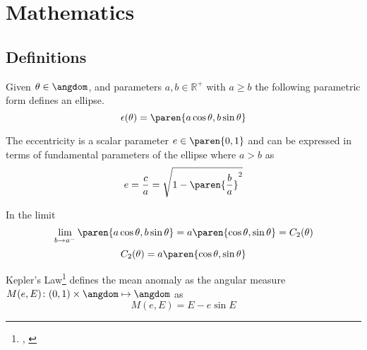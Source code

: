 % 

\section{Mathematics}
\label{sec:math}

\subsection{Definitions}
\begin{definition}
Given $\theta \in \angdom$, and parameters $a, b \in\mathbb{R}^{+}$ with $a\ge b$ the following parametric form defines an ellipse.
\begin{equation}
	\epsilon(\theta) = \paren{ a \cos \theta, b\sin \theta }
\label{eq:ellipse}
\end{equation}
\end{definition}
\begin{definition}
The eccentricity is a scalar parameter $e \in \paren{0,1}$ and can be expressed in terms of fundamental parameters of the ellipse where $a > b$ as
\begin{equation}
	e = \frac{c}{a} = \sqrt{1 - \paren{\frac{b}{a}}^{2}}
\label{eq:eccentricity}
\end{equation}
\end{definition}
\begin{definition}
In the limit
\begin{equation*}
	\lim\limits_{b\to a^{-}} \paren{ a \cos \theta, b\sin \theta } = a \paren{ \cos \theta, \sin \theta } = C_{2}(\theta)
\end{equation*}
\begin{equation}
	C_{2}(\theta) = a \paren{ \cos \theta, \sin \theta }
\label{eq:circle}
\end{equation}
\end{definition}
\begin{definition}
Kepler's Law\footnote{
\cite[eq 4.5]{bate2020fundamentals}
\cite[p.159]{moulton1970introduction}
\cite[\S2.2]{vallado2022}, \cite[3-19]{kaula2013theory}} 
defines the mean anomaly as the angular measure $M(e,E)\colon(0,1)\times \angdom \mapsto \angdom $ as
\begin{equation}
	M(e,E) = E - e \sin E
\label{eq:mean anomaly}
\end{equation}
\end{definition}

